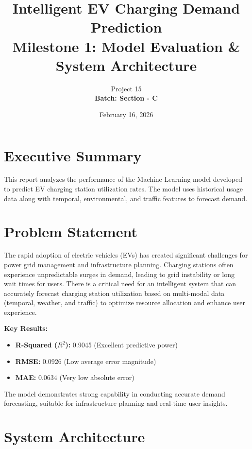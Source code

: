 \documentclass{article}
\title{Intelligent EV Charging Demand Prediction \\ \large Milestone 1: Model Evaluation \& System Architecture}
\author{Project 15 \\ \textbf{Batch: Section - C}}
\date{February 16, 2026}
\begin{document}
\maketitle

\section{Executive Summary}
This report analyzes the performance of the Machine Learning model developed to predict EV charging station utilization rates. The model uses historical usage data along with temporal, environmental, and traffic features to forecast demand.

\section{Problem Statement}
The rapid adoption of electric vehicles (EVs) has created significant challenges for power grid management and infrastructure planning. Charging stations often experience unpredictable surges in demand, leading to grid instability or long wait times for users. There is a critical need for an intelligent system that can accurately forecast charging station utilization based on multi-modal data (temporal, weather, and traffic) to optimize resource allocation and enhance user experience.

\textbf{Key Results:}
\begin{itemize}
    \item \textbf{R-Squared ($R^2$):} 0.9045 (Excellent predictive power)
    \item \textbf{RMSE:} 0.0926 (Low average error magnitude)
    \item \textbf{MAE:} 0.0634 (Very low absolute error)
\end{itemize}

The model demonstrates strong capability in conducting accurate demand forecasting, suitable for infrastructure planning and real-time user insights.

\section{System Architecture}
\end{document}
